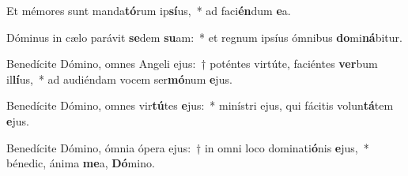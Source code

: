 \item Et mémores sunt manda\textbf{tó}rum ip\textbf{sí}us,~* ad faci\textbf{én}dum \textbf{e}a.
\item Dóminus in cælo parávit \textbf{se}dem \textbf{su}am:~* et regnum ipsíus ómnibus \textbf{do}mi\textbf{ná}bitur.
\item Benedícite Dómino, omnes Angeli ejus:~† poténtes virtúte, faciéntes \textbf{ver}bum il\textbf{lí}us,~* ad audiéndam vocem ser\textbf{mó}num \textbf{e}jus.
\item Benedícite Dómino, omnes vir\textbf{tú}tes \textbf{e}jus:~* minístri ejus, qui fácitis volun\textbf{tá}tem \textbf{e}jus.
\item Benedícite Dómino, ómnia ópera ejus:~† in omni loco dominati\textbf{ó}nis \textbf{e}jus,~* bénedic, ánima \textbf{me}a, \textbf{Dó}mino.
